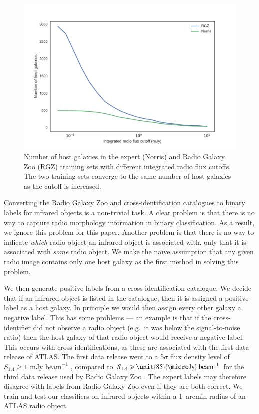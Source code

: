 \documentclass[fleqn,usenatbib,usedcolumn]{mnras}
\newcommand{\jansky}{\text{Jy}}
\begin{document}
    \begin{figure}
      \centering
      \includegraphics[width=\columnwidth]{images/host_galaxies_flux_cutoff.pdf}
      \caption{Number of host galaxies in the expert (Norris) and Radio Galaxy
        Zoo (RGZ) training sets with different integrated radio flux cutoffs.
        The two training sets converge to the same number of host galaxies as
        the cutoff is increased.}
    \end{figure}
    
    Converting the Radio Galaxy Zoo and \citet{norris06} cross-identification
    catalogues to binary labels for infrared objects is a non-trivial task. A
    clear problem is that there is no way to capture radio morphology
    information in binary classification. As a result, we ignore this problem
    for this paper. Another problem is that there is no way to indicate
    \emph{which} radio object an infrared object is associated with, only that
    it is associated with \emph{some} radio object. We make the na\"ive
    assumption that any given radio image contains only one host galaxy as the
    first method in solving this problem.

    We then generate positive labels from a cross-identification catalogue.
    We decide that if an infrared object is listed in the catalogue, then it
    is assigned a positive label as a host galaxy. In principle we would
    then assign every other galaxy a negative label. This has some problems
    --- an example is that if the cross-identifier did not observe a radio
    object (e.g.~it was below the signal-to-noise ratio) then the host galaxy of
    that radio object would receive a negative label. This occurs with
    \citet{norris06} cross-identifications, as these are associated with the
    first data release of ATLAS. The first data release went to a 5$\sigma$ flux
    density level of $S_{1.4} \geq 1 \text{ mJy beam}^{-1}$ \citep{norris06},
    compared to $S_{1.4} \geq \unit{85}{\micro\jansky}\text{ beam}^{-1}$ for the
    third data release used by Radio Galaxy Zoo \citep{franzen15}. The expert
    labels may therefore disagree with labels from Radio Galaxy Zoo even if they
    are both correct. We train and test our classifiers on infrared objects
    within a 1~arcmin radius of an ATLAS radio object.
\end{document}
